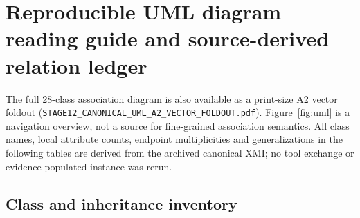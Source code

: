 \clearpage
\section{Reproducible UML diagram reading guide and source-derived relation ledger}
\label{sec:uml-ledger}
The full 28-class association diagram is also available as a print-size A2 vector foldout (\texttt{STAGE12\_CANONICAL\_UML\_A2\_VECTOR\_FOLDOUT.pdf}). Figure~\ref{fig:uml} is a navigation overview, not a source for fine-grained association semantics. All class names, local attribute counts, endpoint multiplicities and generalizations in the following tables are derived from the archived canonical XMI; no tool exchange or evidence-populated instance was rerun.
\subsection{Class and inheritance inventory}
\begingroup\small
